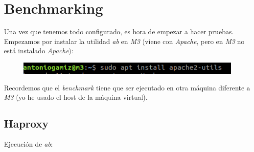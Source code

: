 \documentclass[12pt]{article}
\begin{document}
\section{Benchmarking}

Una vez que tenemos todo configurado, es hora de empezar a hacer pruebas. Empezamos por instalar la utilidad \textit{ab} en \textit{M3} (viene con \textit{Apache}, pero en \textit{M3} no está instalado \textit{Apache}):

\begin{figure}[H]
\center
\includegraphics[scale=0.5]{16.png}
\end{figure}

Recordemos que el \textit{benchmark} tiene que ser ejecutado en otra máquina diferente a \textit{M3} (yo he usado el host de la máquina virtual).

\subsection{Haproxy}

Ejecución de \textit{ab}:
\end{document}
